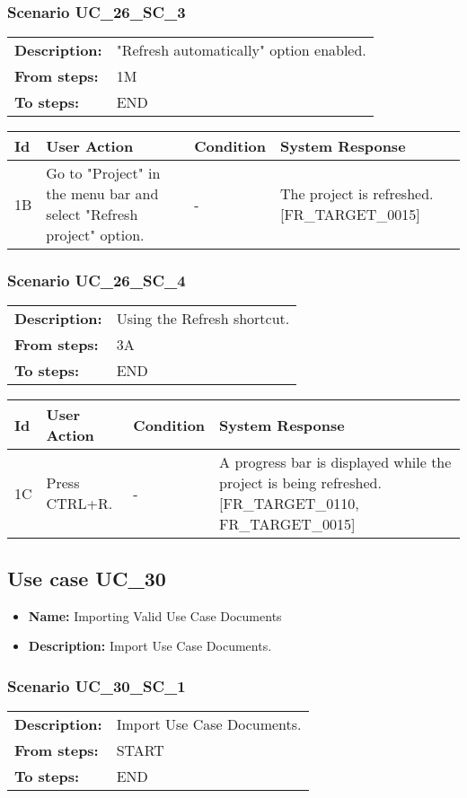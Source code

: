 \documentclass[a4paper,11pt]{article}
\newcommand{\bl}{\\ \hline}
\begin{document}
\subsubsection*{Scenario UC_26_SC_3}
\begin{tabular}{p{1in}p{4in}}
{\bf Description:} & "Refresh automatically" option enabled. \\
{\bf From steps:} & 1M \\
{\bf To steps:} & END \\
\end{tabular}
 
\begin{tabular}{|p{0.8in}|p{1.6in}|p{1.6in}|p{1.6in}|}
\hline
Id & User Action & Condition & System Response  \bl 
1B & Go to "Project" in the menu bar and select "Refresh project" option. & - & The project is refreshed. [FR_TARGET_0015] \bl 
\end{tabular}
\subsubsection*{Scenario UC_26_SC_4}
\begin{tabular}{p{1in}p{4in}}
{\bf Description:} & Using the Refresh shortcut. \\
{\bf From steps:} & 3A \\
{\bf To steps:} & END \\
\end{tabular}
 
\begin{tabular}{|p{0.8in}|p{1.6in}|p{1.6in}|p{1.6in}|}
\hline
Id & User Action & Condition & System Response  \bl 
1C & Press CTRL+R. & - & A progress bar is displayed while the project is being refreshed. [FR_TARGET_0110, FR_TARGET_0015] \bl 
\end{tabular}
\subsection*{Use case UC_30}
\begin{itemize}
\item {\bf Name: }Importing Valid Use Case Documents
\item {\bf Description: }Import Use Case Documents.
\end{itemize}
\subsubsection*{Scenario UC_30_SC_1}
\begin{tabular}{p{1in}p{4in}}
{\bf Description:} & Import Use Case Documents. \\
{\bf From steps:} & START \\
{\bf To steps:} & END \\
\end{tabular}
 
\end{document}
